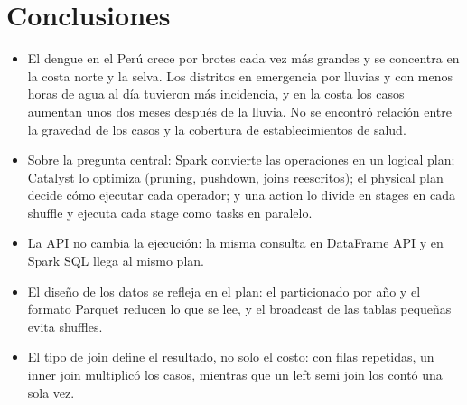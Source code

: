 \section{Conclusiones}
\label{sec:conclusions}

\begin{itemize}
  \item El dengue en el Perú crece por brotes cada vez más grandes y se concentra en la costa norte y la selva.
        Los distritos en emergencia por lluvias y con menos horas de agua al día tuvieron más incidencia, y en la
        costa los casos aumentan unos dos meses después de la lluvia. No se encontró relación entre la gravedad
        de los casos y la cobertura de establecimientos de salud.
  \item Sobre la pregunta central: Spark convierte las operaciones en un logical plan; Catalyst lo optimiza
        (pruning, pushdown, joins reescritos); el physical plan decide cómo ejecutar cada operador; y una action
        lo divide en stages en cada shuffle y ejecuta cada stage como tasks en paralelo.
  \item La API no cambia la ejecución: la misma consulta en DataFrame API y en Spark SQL llega al mismo plan.
  \item El diseño de los datos se refleja en el plan: el particionado por año y el formato Parquet reducen lo que
        se lee, y el broadcast de las tablas pequeñas evita shuffles.
  \item El tipo de join define el resultado, no solo el costo: con filas repetidas, un inner join multiplicó los
        casos, mientras que un left semi join los contó una sola vez.
\end{itemize}
